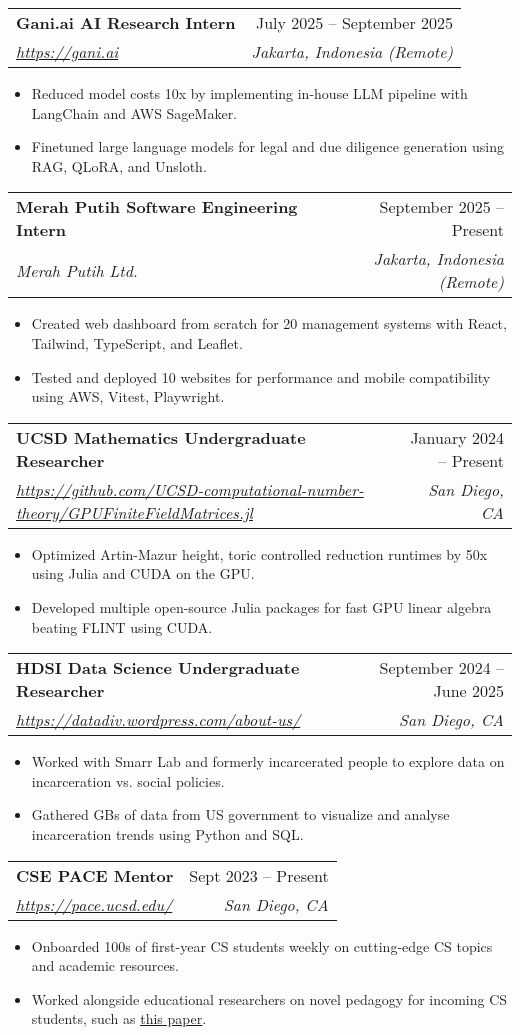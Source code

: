 \documentclass[letterpaper,12pt]{article}
\makeatletter
\newcommand{\resumeItem}[1]{
  \item\small{
    {#1 \vspace{-5pt}}
  }
}
\newcommand{\resumeSubheading}[4]{
  \vspace{-0pt}\item
    \begin{tabular*}{0.97\textwidth}[t]{l@{\extracolsep{\fill}}r}
        \vspace{-3pt}
      \textbf{#1} & #2  \\
      \textit{\footnotesize#3} & \textit{\small #4} \\
    \end{tabular*}\vspace{-8pt}
}
\newcommand{\resumeItemListStart}{\begin{itemize}}
\newcommand{\resumeItemListEnd}{\end{itemize}\vspace{-5pt}}
\makeatother
\begin{document}
    \resumeSubheading
      {Gani.ai AI Research Intern}{July 2025 -- September 2025}
      {\href{https://gani.ai}{https://gani.ai}}{Jakarta, Indonesia (Remote)}
      \resumeItemListStart
        \resumeItem{Reduced model costs 10x by implementing in-house LLM pipeline with LangChain and AWS SageMaker.}
        \resumeItem{Finetuned large language models for legal and due diligence generation using RAG, QLoRA, and Unsloth.}
    \resumeItemListEnd

    \resumeSubheading
      {Merah Putih Software Engineering Intern}{September 2025 -- Present}
      {Merah Putih Ltd.}{Jakarta, Indonesia (Remote)}
      \resumeItemListStart
        \resumeItem{Created web dashboard from scratch for 20 management systems with React, Tailwind, TypeScript, and Leaflet.}
        \resumeItem{Tested and deployed 10 websites for performance and mobile compatibility using AWS, Vitest, Playwright.}
    \resumeItemListEnd

    \resumeSubheading
      {UCSD Mathematics Undergraduate Researcher}{January 2024 -- Present}
      {\href{https://github.com/UCSD-computational-number-theory/GPUFiniteFieldMatrices.jl}{https://github.com/UCSD-computational-number-theory/GPUFiniteFieldMatrices.jl}}{San Diego, CA}
      \resumeItemListStart
        \resumeItem{Optimized Artin-Mazur height, toric controlled reduction runtimes by 50x using Julia and CUDA on the GPU.}
        \resumeItem{Developed multiple open-source Julia packages for fast GPU linear algebra beating FLINT using CUDA.}
    \resumeItemListEnd

    \resumeSubheading
      {HDSI Data Science Undergraduate Researcher}{September 2024 -- June 2025}
      {\href{https://datadiv.wordpress.com/about-us/}{https://datadiv.wordpress.com/about-us/}}{San Diego, CA}
      \resumeItemListStart
        \resumeItem{Worked with Smarr Lab and formerly incarcerated people to explore data on incarceration vs. social policies.}
        \resumeItem{Gathered GBs of data from US government to visualize and analyse incarceration trends using Python and SQL.}
    \resumeItemListEnd

    \resumeSubheading
      {CSE PACE Mentor}{Sept 2023 -- Present}
      {\href{https://pace.ucsd.edu/}{https://pace.ucsd.edu/}}{San Diego, CA}
      \resumeItemListStart 
        \resumeItem{Onboarded 100s of first-year CS students weekly on cutting-edge CS topics and academic resources.}
        \resumeItem{Worked alongside educational researchers on novel pedagogy for incoming CS students, such as \href{https://dl.acm.org/doi/pdf/10.1145/3626252.3630964}{\underline{this paper}}.}
      \resumeItemListEnd
\end{document}
